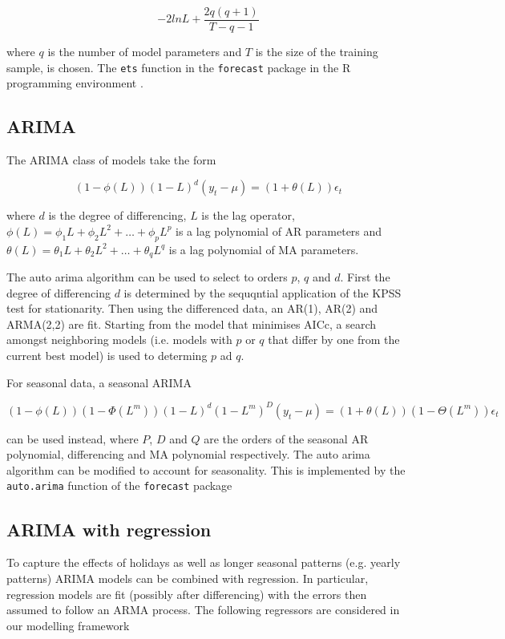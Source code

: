 \documentclass{article}
\begin{document}
$$-2lnL+\frac{2q(q+1)}{T-q-1}$$

where $q$  is the number of model parameters and $T$ is the size of the training sample, is chosen. The \texttt{ets} function in the \texttt{forecast} package \citep{ForPac} in the R programming environment \citep{R2020}.

\subsection{ARIMA}

The ARIMA class of models take the form

\[(1-\phi(L))(1-L)^d(y_t-\mu)=(1+\theta(L))\epsilon_t\]

where $d$ is the degree of differencing, $L$ is the lag operator, $\phi(L)=\phi_1L+\phi_2L^2+\dots+\phi_pL^p$ is a lag polynomial of AR parameters and $\theta(L)=\theta_1L+\theta_2L^2+\dots+\theta_qL^q$ is a lag polynomial of MA parameters.

The auto arima algorithm \citep{HynKha2008} can be used to select to orders $p$, $q$ and $d$. First the degree of differencing $d$ is determined by the sequqntial application of the KPSS test for stationarity. Then using the differenced data, an AR(1), AR(2) and ARMA(2,2) are fit. Starting from the model that minimises AICc, a search amongst neighboring models (i.e. models with $p$ or $q$ that differ by one from the current best model) is used to determing $p$ ad $q$.

For seasonal data, a seasonal ARIMA

\[(1-\phi(L))(1-\Phi(L^m))(1-L)^d(1-L^m)^D(y_t-\mu)=(1+\theta(L))(1-\Theta(L^m))\epsilon_t
\]

can be used instead, where $P$, $D$ and $Q$ are the orders of the seasonal AR polynomial, differencing and MA polynomial respectively. The auto arima algorithm can be modified to account for seasonality. This is implemented by the \texttt{auto.arima} function of the \texttt{forecast} package

\subsection{ARIMA with regression}

To capture the effects of holidays as well as longer seasonal patterns (e.g. yearly patterns) ARIMA models can be combined with regression. In particular, regression models are fit (possibly after differencing) with the errors then assumed to follow an ARMA process. The following regressors are considered in our modelling framework
\end{document}
